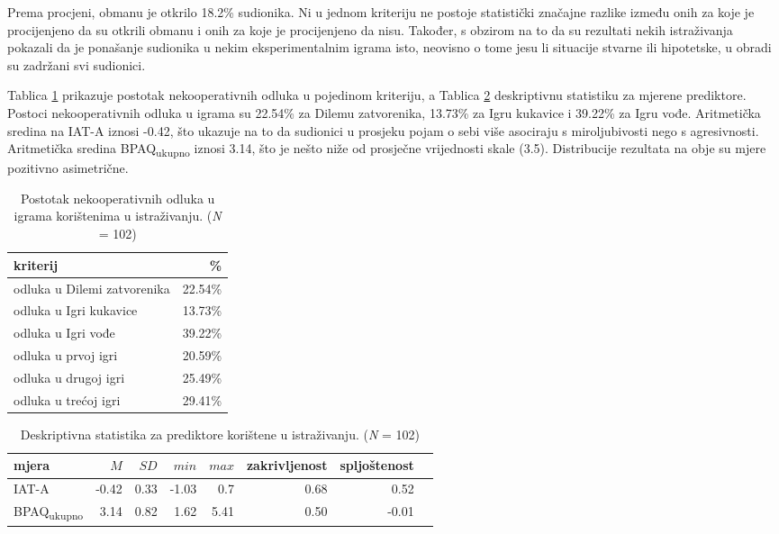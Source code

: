 \documentclass[a4paper, 12pt]{report}
\newcommand{\mti}[1]{\textit{#1}}
\begin{document}
Prema procjeni, obmanu je otkrilo 18.2\% sudionika. 
Ni u jednom kriteriju ne postoje statistički značajne
razlike između onih za koje je procijenjeno da su otkrili obmanu i onih za koje
je procijenjeno da nisu.
Također, s obzirom na to da su rezultati nekih istraživanja
\citep{ben2008economic} pokazali da je ponašanje sudionika u nekim
eksperimentalnim igrama isto, neovisno o tome jesu li situacije stvarne ili
hipotetske, u obradi su zadržani svi sudionici.

Tablica \ref{deskr krit} prikazuje postotak nekooperativnih odluka u
pojedinom kriteriju, a Tablica \ref{deskr pred} deskriptivnu statistiku za mjerene
prediktore.
Postoci nekooperativnih odluka u igrama su 22.54\% za Dilemu zatvorenika, 13.73\% za Igru
kukavice  i 39.22\% za Igru vođe. 
Aritmetička sredina na IAT-A iznosi -0.42, što ukazuje na
to da sudionici u prosjeku pojam o sebi više asociraju s miroljubivosti
nego s agresivnosti. 
Aritmetička sredina BPAQ\textsubscript{ukupno} iznosi 3.14, što je nešto niže od
prosječne vrijednosti skale (3.5).
Distribucije rezultata na obje su mjere pozitivno
asimetrične.

\begin{table}
    \caption{Postotak nekooperativnih odluka u igrama korištenima u
        istraživanju. (\mti{N} =
        102)\label{deskr krit}}
    \centering
    \begin{tabular}{l*{1}{r}}
        \toprule
        kriterij & \%\\
        \midrule
        odluka u Dilemi zatvorenika & 22.54\% \\
        odluka u Igri kukavice & 13.73\% \\
        odluka u Igri vođe & 39.22\% \\
        odluka u prvoj igri & 20.59\% \\
        odluka u drugoj igri & 25.49\% \\
        odluka u trećoj igri & 29.41\% \\
        \bottomrule
    \end{tabular}
\end{table}

\begin{table}[h]
    \caption{Deskriptivna statistika za prediktore korištene u 
        istraživanju. (\mti{N} = 102)\label{deskr pred}}
    \centering
    \begin{tabular}{l*{7}{r}}
        \toprule
        mjera & $M$ & $SD$ & $min$ & $max$ & zakrivljenost & spljoštenost\\
        \midrule
        IAT-A & -0.42 & 0.33 & -1.03 & 0.7 & 0.68 & 0.52\\
        BPAQ\textsubscript{ukupno} & 3.14 & 0.82 & 1.62 & 5.41 & 0.50 & -0.01\\
        \bottomrule
    \end{tabular}
\end{table}
\end{document}
